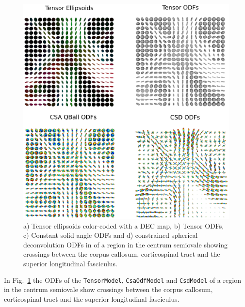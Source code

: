 \documentclass{bioinfo}
\begin{document}
\begin{figure}[!htb]
\centerline{\includegraphics[width=180mm]{Figures/ten_csa_csd2.eps}}
\caption{a) Tensor ellipsoids color-coded with a DEC map, b) Tensor
  ODFs, c) Constant solid angle ODFs and d) constrained
  spherical deconvolution ODFs in of a region in the
centrum semiovale showing crossings between the corpus callosum,
corticospinal tract and the superior longitudinal
fasciculus.\label{Fig:ten_csa_csd}}
\end{figure}

In Fig.~\ref{Fig:ten_csa_csd} the ODFs of the \texttt{TensorModel},
\texttt{CsaOdfModel} and \texttt{CsdModel} of a region in the
centrum semiovale show crossings between the corpus callosum,
corticospinal tract and the superior longitudinal fasciculus.
\end{document}

